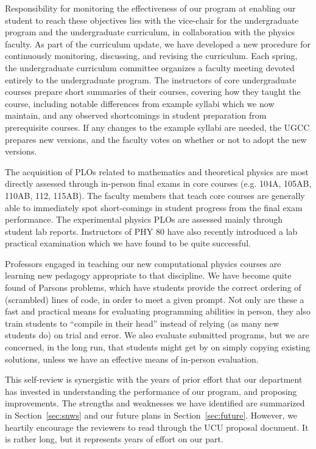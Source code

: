 \documentclass[12pt]{article}
\begin{document}
Responsibility for monitoring the effectiveness of our program at
enabling our student to reach these objectives lies with the
vice-chair for the undergraduate program and the undergraduate
curriculum, in collaboration with the physics faculty.  As part of the
curriculum update, we have developed a new procedure for continuously
monitoring, discussing, and revising the curriculum.  Each spring, the
undergraduate curriculum committee organizes a faculty meeting devoted
entirely to the undergraduate program.  The instructors of core
undergraduate courses prepare short summaries of their courses,
covering how they taught the course, including notable differences
from example syllabi which we now maintain, and any observed
shortcomings in student preparation from prerequisite courses.  If any
changes to the example syllabi are needed, the UGCC prepares new
versions, and the faculty votes on whether or not to adopt the new
versions.

The acquisition of PLOs related to mathematics and theoretical physics
are most directly assessed through in-person final exams in core
courses (e.g. 104A, 105AB, 110AB, 112, 115AB).  The faculty members
that teach core courses are generally able to immediately spot
short-comings in student progress from the final exam performance.
The experimental physics PLOs are assessed mainly through student lab
reports.  Instructors of PHY 80 have also recently introduced a lab
practical examination which we have found to be quite successful.

Professors engaged in teaching our new computational physics courses
are learning new pedagogy appropriate to that discipline.  We have
become quite found of Parsons problems, which have students provide
the correct ordering of (scrambled) lines of code, in order to meet a
given prompt.  Not only are these a fast and practical means for
evaluating programming abilities in person, they also train students
to ``compile in their head'' instead of relying (as many
new students do) on trial and error.  We also evaluate submitted
programs, but we are concerned, in the long run, that students might
get by on simply copying existing solutions, unless we have an
effective means of in-person evaluation.

This self-review is synergistic with the years of prior effort that
our department has invested in understanding the performance of our
program, and proposing improvements.  The strengths and weaknesses we
have identified are summarized in Section~\ref{sec:snws} and our
future plans in Section~\ref{sec:future}.  However, we heartily
encourage the reviewers to read through the UCU proposal document.  It
is rather long, but it represents years of effort on our part.\\[3pt]
\end{document}
